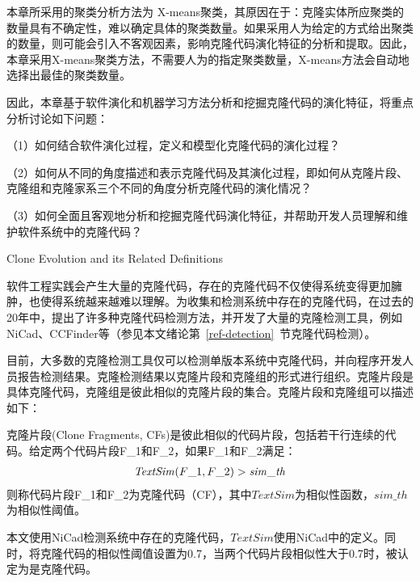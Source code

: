 本章所采用的聚类分析方法为 X-means\cite{pelleg2000x}聚类，其原因在于：克隆实体所应聚类的数量具有不确定性，难以确定具体的聚类数量。如果采用人为给定的方式给出聚类的数量，则可能会引入不客观因素，影响克隆代码演化特征的分析和提取。因此，本章采用X-means聚类方法，不需要人为的指定聚类数量，X-means方法会自动地选择出最佳的聚类数量。

因此，本章基于软件演化和机器学习方法分析和挖掘克隆代码的演化特征，将重点分析讨论如下问题：

（1）如何结合软件演化过程，定义和模型化克隆代码的演化过程？

（2）如何从不同的角度描述和表示克隆代码及其演化过程，即如何从克隆片段、克隆组和克隆家系三个不同的角度分析克隆代码的演化情况？

（3）如何全面且客观地分析和挖掘克隆代码演化特征，并帮助开发人员理解和维护软件系统中的克隆代码？%

{Clone Evolution and its Related  Definitions}
\label{lab-evolution}

软件工程实践会产生大量的克隆代码，存在的克隆代码不仅使得系统变得更加臃肿，也使得系统越来越难以理解。为收集和检测系统中存在的克隆代码，在过去的20年中，提出了许多种克隆代码检测方法，并开发了大量的克隆检测工具，例如NiCad\cite{roy2008nicad}、CCFinder\cite{kamiya2002ccfinder}等（参见本文绪论第~\ref{ref-detection}~节克隆代码检测）。

目前，大多数的克隆检测工具仅可以检测单版本系统中克隆代码，并向程序开发人员报告检测结果。克隆检测结果以克隆片段和克隆组的形式进行组织。克隆片段是具体克隆代码，克隆组是彼此相似的克隆片段的集合。克隆片段和克隆组可以描述如下：

\begin{definition}[克隆片段]
\label{defn-clonefragment}
克隆片段(Clone Fragments, CFs)是彼此相似的代码片段，包括若干行连续的代码。给定两个代码片段F\_1和F\_2，如果F\_1和F\_2满足：
\[
  \begin{array}[t]{c}
    \mathit{TextSim}(F\_1, F\_2) > \mathit{sim\_th} \\
  \end{array}
\]
则称代码片段F\_1和F\_2为克隆代码（CF），其中$TextSim$为相似性函数，$sim\_th$为相似性阈值。
\end{definition}

本文使用NiCad检测系统中存在的克隆代码，$TextSim$使用NiCad中的定义。同时，将克隆代码的相似性阈值设置为0.7，当两个代码片段相似性大于0.7时，被认定为是克隆代码。

